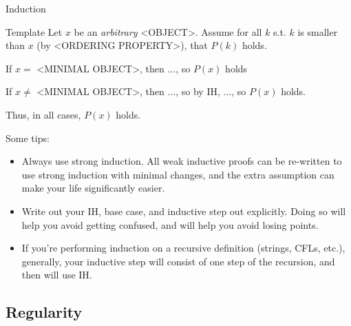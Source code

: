 \documentclass{beamer}
\begin{document}
\begin{frame}[t]{Induction}
    \begin{exampleblock}{Template}
    Let $x$ be an \textit{arbitrary} <OBJECT>. Assume for all $k$ s.t. $k$ is smaller than $x$ (by <ORDERING PROPERTY>), that $P(k)$ holds.

    \vspace{.5cm}
    
    If $x =$ <MINIMAL OBJECT>, then $\dotsc$, so $P(x)$ holds

    \vspace{.5cm}

    If $x \neq$ <MINIMAL OBJECT>, then $\dotsc$, so by IH, $\dotsc$, so $P(x)$ holds.

    \vspace{.5cm}

    Thus, in all cases, $P(x)$ holds.
    \end{exampleblock}
    \vspace{.7 cm}
    \pause Some tips:
    \begin{itemize}
        \item \alert{Always use strong induction}. All weak inductive proofs can be re-written to use strong induction with minimal changes, and the extra assumption can make your life significantly easier.
        \item \alert{Write out your IH, base case, and inductive step out explicitly.} Doing so will help you avoid getting confused, and will help you avoid losing points.
        \item If you're performing induction on a recursive definition (strings, CFLs, etc.), generally, your inductive step will consist of one step of the recursion, and then will use IH.
    \end{itemize}
\end{frame}

\subsection{Regularity}
\end{document}

